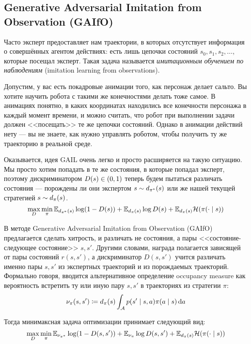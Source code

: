 \subsection{Generative Adversarial Imitation from Observation (GAIfO)}

Часто эксперт предоставляет нам траектории, в которых отсутствует информация о совершённых агентом действиях: есть лишь цепочки состояний $s_0, s_1, s_2, \dots$, которые посещал эксперт. Такая задача называется \emph{имитационным обучением по наблюдениям} (imitation learning from observations).

\begin{example}
Допустим, у вас есть покадровые анимации того, как персонаж делает сальто. Вы хотите научить робота с такими же конечностями делать тоже самое. В анимациях понятно, в каких координатах находились все конечности персонажа в каждый момент времени, и можно считать, что робот при выполнении задачи должен <<посещать>> те же цепочки состояний. Однако в анимации действий нету --- вы не знаете, как нужно управлять роботом, чтобы получить ту же траекторию в реальной среде.
\end{example}

Оказывается, идея GAIL очень легко и просто расширяется на такую ситуацию. Мы просто хотим попадать в те же состояния, в которые попадал эксперт, поэтому дискриминатором $D(s) \HM \in (0, 1)$ теперь будем пытаться различать состояния --- порождены ли они экспертом $s \HM\sim d_{\pi^*}(s)$ или же нашей текущей стратегией $s \HM\sim d_{\pi}(s)$.
$$
\max\limits_{D} \min\limits_{\pi} \mathbb{E}_{d_{\pi^*}(s)} \log (1 - D(s)) + \mathbb{E}_{d_{\pi}(s)} \log D(s) + \mathbb{E}_{d_\pi(s)}\mathcal{H}(\pi(\cdot \mid s))
$$

В методе Generative Adversarial Imitation from Observation (GAIfO) предлагается сделать хитрость, и различать не состояния, а пары <<состояние-следующее состояние>> $s, s'$. Другими словами, награда полагается зависящей от пары состояний $r(s, s')$, а дискриминатор $D(s, s')$ учится различать именно пары $s, s'$ из экспертных траекторий и из порождаемых траекторий. Формально говоря, вводится альтернативное определение occupancy measure как вероятность встретить ту или иную пару $s, s'$ в траекториях из стратегии $\pi$:
$$
\nu_\pi(s, s') \coloneqq d_\pi(s) \int_{\mathcal{A}} p(s' \mid s, a) \pi(a \mid s) \mathop{}\!\mathrm{d} a
$$

Тогда минимаксная задача оптимизации принимает следующий вид:
$$
\max\limits_{D} \min\limits_{\pi} \mathbb{E}_{\nu_{\pi^*}} \log (1 - D(s, s')) + \mathbb{E}_{\nu_\pi} \log D(s, s') + \mathbb{E}_{d_\pi(s)}\mathcal{H}(\pi(\cdot \mid s))
$$

